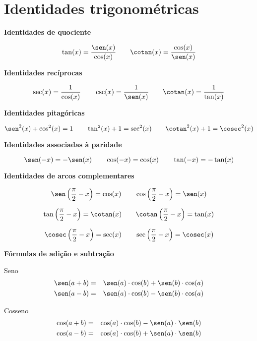  \newpage

 \section{Identidades trigonométricas}

 \textbf{Identidades de quociente}

\begin{equation}
\tan(x)= \dfrac{\sen(x)}{\cos(x)} \qquad \cotan(x)= \dfrac{\cos(x)}{\sen(x)}
\end{equation}

 \vskip0.5cm
 \textbf{Identidades recíprocas}

 \[\sec(x)= \dfrac{1}{\cos(x)} \qquad
   \csc(x)= \dfrac{1}{\sen(x)} \qquad
   \cotan(x)= \dfrac{1}{\tan(x)}\]

 \vskip0.5cm
 \textbf{Identidades pitagóricas}

 \[\sen^2(x) + \cos^2(x)= 1 \qquad
   \tan^2(x)+ 1= \sec^2(x) \qquad
   \cotan^2(x)+1=\cosec^2(x)\]

 \vskip0.5cm
 \textbf{Identidades associadas à paridade}

\begin{equation}
\sen(-x)= -\sen(x) \qquad \cos(-x)= \cos(x) \qquad \tan(-x)=-\tan(x)
\end{equation}

 \vskip0.5cm
 \textbf{Identidades de arcos complementares}

 \[\sen \left(\frac{\pi}{2} - x \right)= \cos(x) \qquad
   \cos \left(\frac{\pi}{2} - x \right)= \sen(x)\]

 \[\tan \left(\frac{\pi}{2} - x \right)= \cotan(x) \qquad
   \cotan \left(\frac{\pi}{2} - x \right)= \tan(x)\]

 \[\cosec \left(\frac{\pi}{2} - x \right)= \sec(x) \qquad
   \sec \left(\frac{\pi}{2} - x \right)= \cosec(x)\]


\vskip0.5cm
 \textbf{Fórmulas de adição e subtração}

 Seno
 \begin{eqnarray*}
  \sen(a+b)&=&\sen(a)\cdot \cos(b)+\sen(b)\cdot \cos(a) \\
  \sen(a-b)&=&\sen(a)\cdot \cos(b)-\sen(b)\cdot \cos(a)
 \end{eqnarray*}

 Cosseno
 \begin{eqnarray*}
  \cos(a+b)&=&\cos(a)\cdot \cos(b)-\sen(a)\cdot \sen(b) \\
  \cos(a-b)&=&\cos(a)\cdot \cos(b)+\sen(a)\cdot \sen(b)
 \end{eqnarray*}

